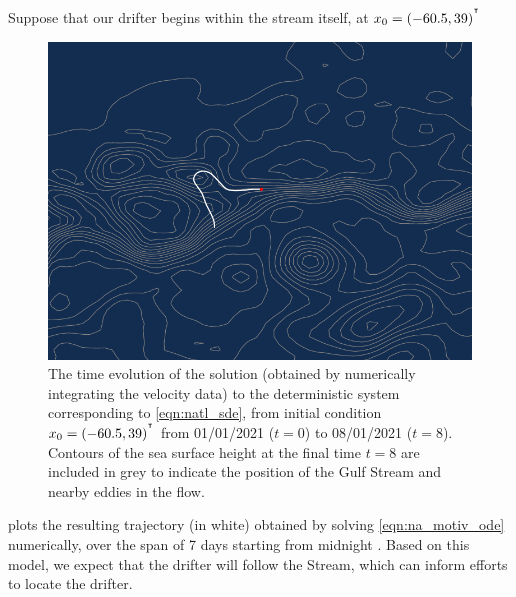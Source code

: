 Suppose that our drifter begins within the stream itself, at \(x_0 = \left(-60.5, 39\right)^{^{\intercal}}\)

\begin{figure}
	\begin{center}
		\includegraphics[width=\textwidth]{chp02_background/figures/gulf_stream_motivation/det_traj.pdf}
		\caption{The time evolution of the solution (obtained by numerically integrating the velocity data) to the deterministic system corresponding to \eqref{eqn:natl_sde}, from initial condition \(x_0 = \left(-60.5, 39\right)^{^{\intercal}}\) from 01/01/2021 (\(t = 0\)) to 08/01/2021 (\(t = 8\)).
			Contours of the sea surface height at the final time \(t = 8\) are included in grey to indicate the position of the Gulf Stream and nearby eddies in the flow.}
		\label{fig:na_motiv_det}
	\end{center}
\end{figure}

 plots the resulting trajectory (in white) obtained by solving \eqref{eqn:na_motiv_ode} numerically, over the span of 7 days starting from midnight .
Based on this model, we expect that the drifter will follow the Stream, which can inform efforts to locate the drifter.

